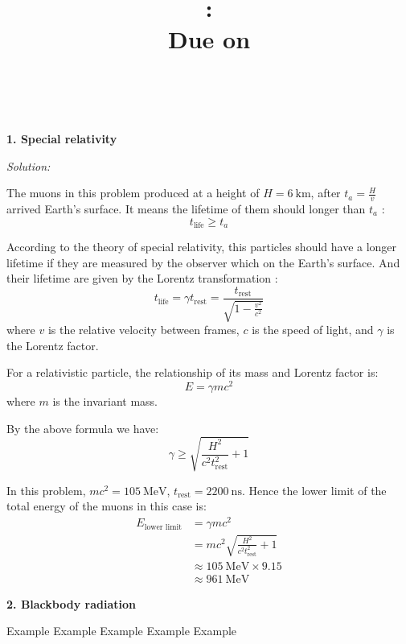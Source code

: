 \documentclass[a4paper]{article}
\title{
    \vspace{1.5in}
    \LARGE{\textbf{\Class: \HomeworkTitle}}\\
    \normalsize\vspace{0.1in}\large{Due on \DueDate}\\
    \vspace{0.08in}\large{\textsc{\ClassInstructor}}
    \vspace{4.5in}
    }
\author{
    \Large{\textsc{\AuthorName}}\\
    \vspace{0.2in}\large{\textrm{\AuthorScholar}}
    }
\date{}
\newcommand{\problem}[1]{\addtolength\parskip{3em}\noindent\textbf{\Large{#1}}\addtolength\parskip{-3em}}
\newcommand{\solution}{\noindent\textsl{\large{Solution:}}}
\begin{document}
\begin{titlepage}
\maketitle
\thispagestyle{empty}
\end{titlepage}

\problem{1. Special relativity}

\solution

The muons in this problem produced at a height of $H=\SI{6}{\kilo\meter}$, after $t_a=\frac{H}{v}$ arrived Earth's surface. It means the lifetime of them should longer than $t_a$ :
\[
t_{\textrm{life}}\geq t_a
\]

According to the theory of special relativity, this particles should have a longer lifetime if they are measured by the observer which on the Earth's surface. And their lifetime are given by the Lorentz transformation :
\[
t_{\textrm{life}}=\gamma  t_{\textrm{rest}} =\frac{t_{\textrm{rest}}}{\sqrt{1-\frac{v^2}{c^2}}}
\]
where $v$ is the relative velocity between frames, $c$ is the speed of light, and $\gamma$ is the Lorentz factor.

For a relativistic particle, the relationship of its mass and Lorentz factor is:
\[
E=\gamma mc^2
\]
where $m$ is the invariant mass.

By the above formula we have:
\[
\gamma\geq\sqrt{\frac{H^2}{c^2t_{\textrm{rest}}^2}+1}
\]

In this problem, $mc^2=\SI{105}{\mega\electronvolt}$, $t_{\textrm{rest}}=\SI{2200}{\nano\second}$. Hence the lower limit of the total energy of the muons in this case is:
\[\begin{aligned}
E_{\textrm{lower limit}}&=\gamma mc^2 \\
&= m c^2 \sqrt{\frac{H^2}{c^2t_{\textrm{rest}}^2} + 1} \\
& \approx \SI{105}{\mega\electronvolt} \times 9.15 \\
& \approx \SI{961}{\mega\electronvolt}
\end{aligned}
\]


\problem{2. Blackbody radiation}

Example Example Example Example Example 
\end{document}
